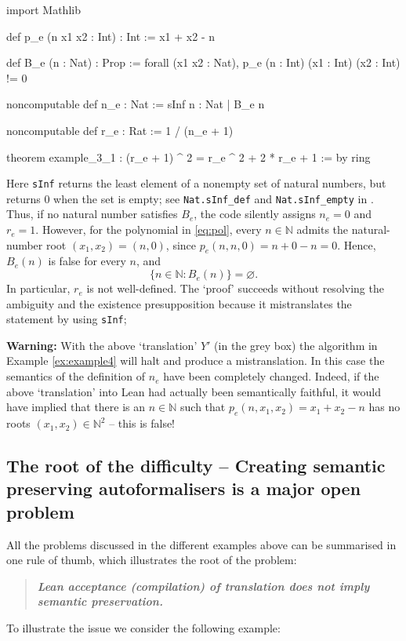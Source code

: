 \documentclass[10pt, a4paper, reqno]{amsart}
\numberwithin{equation}{section}
\theoremstyle{definition}
\theoremstyle{definition}
\begin{document}
\begin{lstlistinglean}
import Mathlib

def p_e (n x1 x2 : Int) : Int := x1 + x2 - n

def B_e (n : Nat) : Prop :=
forall (x1 x2 : Nat), p_e (n : Int) (x1 : Int) (x2 : Int) != 0

noncomputable def n_e : Nat := sInf {n : Nat | B_e n}

noncomputable def r_e : Rat := 1 / (n_e + 1)

theorem example_3_1 : (r_e + 1) ^ 2 = r_e ^ 2 + 2 * r_e + 1 := by ring
\end{lstlistinglean}
	
	\vspace{2mm}
	
	Here \texttt{sInf} returns the least element of a nonempty set
	of natural numbers, but returns $0$ when the set is empty; see \texttt{Nat.sInf\_def} and \texttt{Nat.sInf\_empty} in \cite{MathlibNatInf}.
	Thus, if no natural number satisfies $B_e$, the code silently
	assigns $n_e=0$ and $r_e=1$. 
	However, for the polynomial in \eqref{eq:pol}, every $n\in\mathbb{N}$ admits the natural-number root $(x_1,x_2)=(n,0)$, since $p_e(n,n,0)=n+0-n=0$. Hence, $B_e(n)$ is false for every $n$, and 
	\[
	\{n\in\mathbb{N}:B_e(n)\}=\varnothing.
	\] In particular, $r_e$ is not well-defined. 
	The `proof' succeeds without resolving the ambiguity and the existence presupposition because it mistranslates the statement by using \texttt{sInf};
	
		
	{\bf Warning:} With the above `translation' $Y'$ (in the grey box) the algorithm in Example \ref{ex:example4} will halt and produce a mistranslation. In this case the semantics of the definition of $n_e$ have been completely changed. Indeed, if the above `translation' into Lean had actually been semantically faithful, it would have implied that there is an $n \in \mathbb{N}$ such that $p_e(n,x_1,x_2) = x_1 + x_2 - n$ has no roots $(x_1,x_2) \in \mathbb{N}^2$ -- this is false! 

\subsection{The root of the difficulty -- Creating semantic preserving autoformalisers is a major open problem}
All the problems discussed in the different examples above can be summarised in one rule of thumb, which illustrates the root of the problem:
	\begin{quote}
		{\bf  
			\emph{Lean acceptance (compilation) of translation does not imply semantic preservation.}
		}
	\end{quote}
To illustrate the issue we consider the following example:
\end{document}
